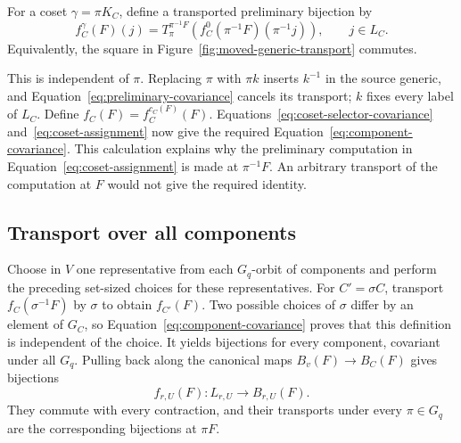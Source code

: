 For a coset $\gamma=\pi K_C$, define a transported preliminary
bijection by
\begin{equation}\label{eq:coset-assignment}
 f_C^\gamma(F)(j)=
 T_\pi^{\pi^{-1}F}
       \left(f_C^0(\pi^{-1}F)(\pi^{-1}j)\right),\qquad j\in L_C.
\end{equation}
Equivalently, the square in Figure~\ref{fig:moved-generic-transport}
commutes.



This is independent of $\pi$. Replacing $\pi$ with $\pi k$ inserts
$k^{-1}$ in the source generic, and
Equation~\eqref{eq:preliminary-covariance} cancels its transport;
$k$ fixes every label of $L_C$. Define
$f_C(F)=f_C^{c_C(F)}(F)$. Equations~\eqref{eq:coset-selector-covariance}
and~\eqref{eq:coset-assignment} now give the required
Equation~\eqref{eq:component-covariance}.
This calculation explains why the preliminary computation in
Equation~\eqref{eq:coset-assignment} is made at $\pi^{-1}F$.
An arbitrary transport of the computation at $F$ would not give the
required identity.

\subsection{Transport over all components}

Choose in $V$ one representative from each $G_q$-orbit of components
and perform the preceding set-sized choices for these representatives.
For $C'=\sigma C$, transport $f_C(\sigma^{-1}F)$ by $\sigma$ to
obtain $f_{C'}(F)$. Two possible choices of $\sigma$ differ by an
element of $G_C$, so Equation~\eqref{eq:component-covariance} proves
that this definition is independent of the choice. It yields
bijections for every component, covariant under all $G_q$. Pulling
back along the canonical maps $B_v(F)\to B_C(F)$ gives bijections
\begin{equation}\label{eq:coherent-fiber-bijections}
 f_{r,U}(F):L_{r,U}\longrightarrow B_{r,U}(F).
\end{equation}
They commute with every contraction, and their transports under every
$\pi\in G_q$ are the corresponding bijections at $\pi F$.

